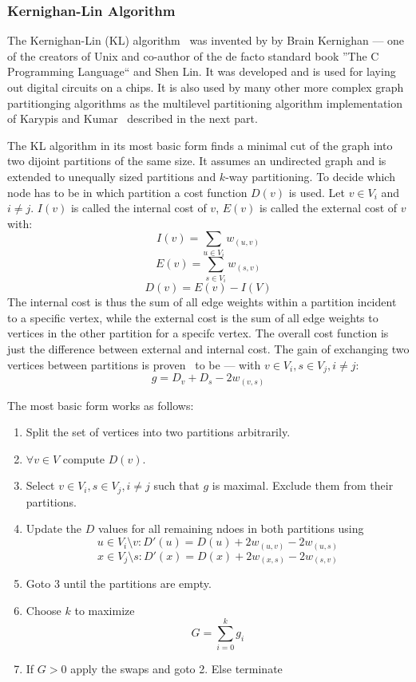             \subsubsection*{Kernighan-Lin Algorithm}\label{kla}
                The Kernighan-Lin (KL) algorithm~\autocite{kl} was invented by by Brain Kernighan --- one of the creators of Unix and co-author of the de facto standard book ''The C Programming Language`` and  Shen Lin.
                It was developed and is used for laying out digital circuits on a chips. 
                It is also used by many other more complex graph partitionging algorithms as the multilevel partitioning algorithm implementation of Karypis and Kumar~\autocite{karypis} described in the next part.
                
                The KL algorithm in its most basic form finds a minimal cut of the graph into two dijoint partitions of the same size. 
                It assumes an undirected graph and is extended to unequally sized partitions and $k$-way partitioning. 
                To decide which node has to be in which partition a cost function $D(v)$ is used. 
                Let $v  \in V_i$ and $i \neq j$. $I(v)$ is called the internal cost of $v$, $E(v)$ is called the external cost of $v$ with:
                \[ I(v) = \sum_{u \in V_i} w_{(u, v)} \]
                \[ E(v) = \sum_{s \in V_i} w_{(s, v)} \]
                \[   D(v) = E(v) - I(V)   \]
                The internal cost is thus the sum of all edge weights within a partition incident to a specific vertex, while the external cost is the sum of all edge weights to vertices in the other partition for a specifc vertex. 
                The overall cost function is just the difference between external and internal cost.
                The gain of exchanging two vertices between partitions is proven~\autocite{kl} to be --- with $v \in V_i, s \in V_j, i \neq j$:
                \[ g = D_v + D_s - 2 w_{(v,s)} \]
                
                The most basic form works as follows:
                \begin{enumerate}
                 \item Split the set of vertices into two partitions arbitrarily.
                 \item $\forall v \in V$ compute $D(v)$.
                 \item Select $v \in V_i, s \in V_j, i \neq j$ such that $g$ is maximal. Exclude them from their partitions.
                 \item Update the $D$ values for all remaining ndoes in both partitions using 
                 \[ u \in V_i \setminus {v}: D'(u) = D(u) + 2 w_{(u, v)} - 2 w_{(u, s)} \]
                 \[ x \in V_j \setminus {s}: D'(x) = D(x) + 2 w_{(x, s)} - 2 w_{(s, v)} \]
                 \item Goto 3 until the partitions are empty.
                 \item Choose $k$ to maximize 
                 \[ G = \sum^k_{i = 0} g_i \]
                 \item If $G > 0$ apply the swaps and goto 2. Else terminate
                \end{enumerate}
                
